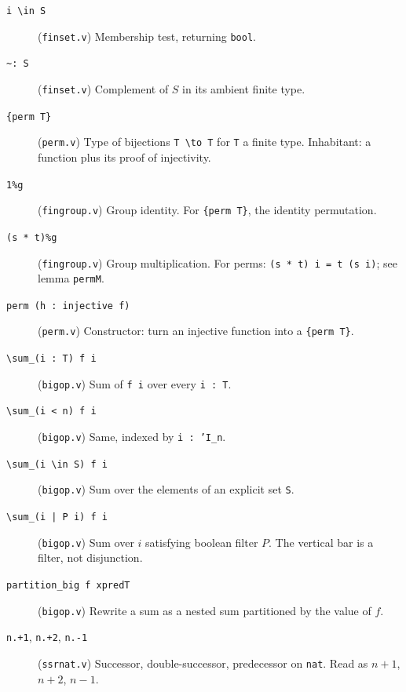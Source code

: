 \begin{description}
  \item[\texttt{i \textbackslash in S}] (\texttt{finset.v})
    Membership test, returning \texttt{bool}.

  \item[\texttt{\textasciitilde:\,S}] (\texttt{finset.v}) Complement
    of $S$ in its ambient finite type.

  \item[\texttt{\{perm T\}}] (\texttt{perm.v}) Type of bijections
    \texttt{T\,\textbackslash to T} for \texttt{T} a finite type.
    Inhabitant: a function plus its proof of injectivity.

  \item[\texttt{1\%g}] (\texttt{fingroup.v}) Group identity. For
    \texttt{\{perm T\}}, the identity permutation.

  \item[\texttt{(s * t)\%g}] (\texttt{fingroup.v}) Group
    multiplication. For perms: \texttt{(s * t) i = t (s i)}; see
    lemma \texttt{permM}.

  \item[\texttt{perm (h\,:\,injective f)}] (\texttt{perm.v})
    Constructor: turn an injective function into a \texttt{\{perm T\}}.

  \item[\texttt{\textbackslash sum\_(i\,:\,T) f i}] (\texttt{bigop.v})
    Sum of \texttt{f i} over every \texttt{i\,:\,T}.

  \item[\texttt{\textbackslash sum\_(i\,<\,n) f i}] (\texttt{bigop.v})
    Same, indexed by \texttt{i\,:\,'I\_n}.

  \item[\texttt{\textbackslash sum\_(i\,\textbackslash in\,S) f i}]
    (\texttt{bigop.v}) Sum over the elements of an explicit set
    \texttt{S}.

  \item[\texttt{\textbackslash sum\_(i\,|\,P i) f i}]
    (\texttt{bigop.v}) Sum over $i$ satisfying boolean filter $P$.
    The vertical bar is a filter, not disjunction.

  \item[\texttt{partition\_big f xpredT}] (\texttt{bigop.v})
    Rewrite a sum as a nested sum partitioned by the value of $f$.

  \item[\texttt{n.+1}, \texttt{n.+2}, \texttt{n.-1}] (\texttt{ssrnat.v})
    Successor, double-successor, predecessor on \texttt{nat}. Read
    as $n+1$, $n+2$, $n-1$.


\end{description}
